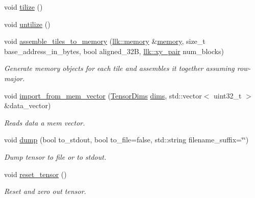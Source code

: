\begin{DoxyCompactItemize}
void \hyperlink{classllk_1_1Tensor_a31ca8040bf822144304e7ef58fbf386f}{tilize} ()
\item 
void \hyperlink{classllk_1_1Tensor_afd6dfcbe2f92dfd0d94fb1e43f1676fb}{untilize} ()
\item 
void \hyperlink{classllk_1_1Tensor_a67d54430c95a5e279516a9470bc8f8fe}{assemble\+\_\+tiles\+\_\+to\+\_\+memory} (\hyperlink{classllk_1_1memory}{llk\+::memory} \&\hyperlink{classllk_1_1memory}{memory}, size\+\_\+t base\+\_\+address\+\_\+in\+\_\+bytes, bool aligned\+\_\+32B, \hyperlink{structllk_1_1xy__pair}{llk\+::xy\+\_\+pair} num\+\_\+blocks)
\begin{DoxyCompactList}\small\item\em Generate memory objects for each tile and assembles it together assuming row-\/major. \end{DoxyCompactList}\item 
void \hyperlink{classllk_1_1Tensor_a880292b460f36aab01d3955097af1d3e}{import\+\_\+from\+\_\+mem\+\_\+vector} (\hyperlink{structllk_1_1TensorDims}{Tensor\+Dims} \hyperlink{classllk_1_1Tensor_a6bad1b600bb823472f1aa770d3bbc173}{dims}, std\+::vector$<$ uint32\+\_\+t $>$ \&data\+\_\+vector)
\begin{DoxyCompactList}\small\item\em Reads data a mem vector. \end{DoxyCompactList}\item 
void \hyperlink{classllk_1_1Tensor_a8204b63ee3d6b146c4346fbc7727f99c}{dump} (bool to\+\_\+stdout, bool to\+\_\+file=false, std\+::string filename\+\_\+suffix=\char`\"{}\char`\"{})
\begin{DoxyCompactList}\small\item\em Dump tensor to file or to stdout. \end{DoxyCompactList}\item 
void \hyperlink{classllk_1_1Tensor_ab11ae4fa56f2ca0ba4e8f2f1670e718f}{reset\+\_\+tensor} ()
\begin{DoxyCompactList}\small\item\em Reset and zero out tensor. \end{DoxyCompactList}\end{DoxyCompactItemize}
